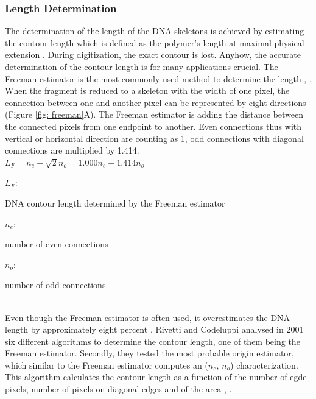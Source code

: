 \documentclass{article}
\begin{document}
\subsubsection{Length Determination} \label{intro_length_determination}

The determination of the length of the DNA skeletons is achieved by estimating the contour length which is defined as the polymer’s length at maximal physical extension  \cite{rivetti2001accurate}.  During digitization, the exact contour is lost. Anyhow, the accurate determination of the contour length is for many applications crucial. The Freeman estimator is the most commonly used method to determine the length  \cite{spisz1998automated},  \cite{marturelliautomated}. When the fragment is reduced to a skeleton with the width of one pixel, the connection between one and another pixel can be represented by eight directions (Figure \ref{fig: freeman}A). The Freeman estimator is adding the distance between the connected pixels from one endpoint to another. Even connections thus with vertical or horizontal direction are counting as 1, odd connections with diagonal connections are multiplied by 1.414. \\

$ L_{F} = n_{e} + \sqrt{2} n_{o}= 1.000n_{e} + 1.414n_{o}  $ 

\hspace{0,2cm}
 
$ L_{F}$: \begin{footnotesize} 
DNA contour length determined by the Freeman estimator
\end{footnotesize}  

$ n_{e}$: \begin{footnotesize} 
 number of even connections
\end{footnotesize} 
 
$ n_{o}$: \begin{footnotesize} 
 number of odd connections
\end{footnotesize}  \\

Even though the Freeman estimator is often used, it overestimates the DNA length by approximately eight percent  \cite{sanchez2002accuracy}. Rivetti and Codeluppi \cite{rivetti2001accurate} analysed in 2001 six different algorithms to determine the contour length, one of them being the Freeman estimator. 
Secondly, they tested the most probable origin estimator, which similar to the Freeman estimator computes an ($n_{e}$, $n_{o}$) characterization. This algorithm calculates the contour length as a function of the number of egde pixels, number of pixels on diagonal edges and of the area \cite{pan1991root}, \cite{dorst1987length}. \\
\end{document}
